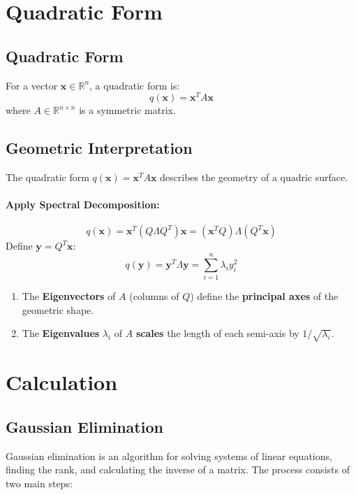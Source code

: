 \documentclass{article}
\begin{document}
\newpage
\section{Quadratic Form}

\subsection{Quadratic Form}
For a vector $\mathbf{x} \in \mathbb{R}^n$, a quadratic form is:
\[
    q(\mathbf{x}) = \mathbf{x}^T A \mathbf{x}
\]
where $A \in \mathbb{R}^{n \times n}$ is a symmetric matrix.

\subsection{Geometric Interpretation}
The quadratic form $q(\mathbf{x}) = \mathbf{x}^T A \mathbf{x}$ describes the geometry of a quadric surface.

\paragraph{Apply Spectral Decomposition:}
\[
    q(\mathbf{x}) = \mathbf{x}^T (Q \Lambda Q^T) \mathbf{x} = (\mathbf{x}^T Q) \Lambda (Q^T \mathbf{x})
\]
Define $\mathbf{y} = Q^T \mathbf{x}$:
\[
    q(\mathbf{y}) = \mathbf{y}^T \Lambda \mathbf{y} = \sum_{i=1}^n \lambda_i y_i^2
\]
\begin{enumerate}
    \item The \textbf{Eigenvectors} of $A$ (columns of $Q$) define the \textbf{principal axes} of the geometric shape.
    \item The \textbf{Eigenvalues} $\lambda_i$ of $A$ \textbf{scales} the length of each semi-axis by $1/\sqrt{\lambda_i}$.
\end{enumerate}


\newpage
\section{Calculation}

\subsection{Gaussian Elimination}
\label{subsec:gauss}

Gaussian elimination is an algorithm for solving systems of linear equations, finding the rank, and calculating the inverse of a matrix. The process consists of two main steps:
\end{document}
